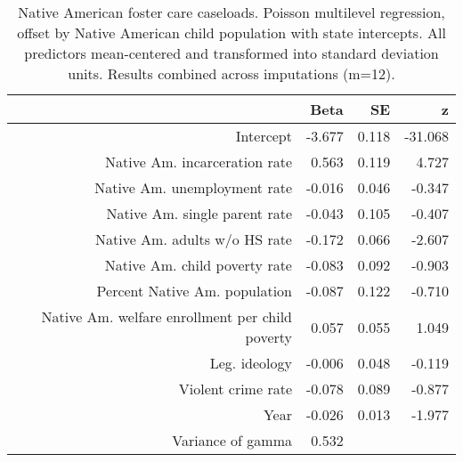 \begin{table}[ht]
\centering
\caption{Native American foster care caseloads. Poisson multilevel regression, 
             offset by Native American child population with state intercepts. 
             All predictors mean-centered and transformed into standard deviation units. 
             Results combined across imputations (m=12).} 
\label{a.c.tab}
\begin{tabular}{rrrr}
  \hline
 & Beta & SE & z \\ 
  \hline
Intercept & -3.677 & 0.118 & -31.068 \\ 
  Native Am. incarceration rate & 0.563 & 0.119 & 4.727 \\ 
  Native Am. unemployment rate & -0.016 & 0.046 & -0.347 \\ 
  Native Am. single parent rate & -0.043 & 0.105 & -0.407 \\ 
  Native Am. adults w/o HS rate & -0.172 & 0.066 & -2.607 \\ 
  Native Am. child poverty rate & -0.083 & 0.092 & -0.903 \\ 
  Percent Native Am. population & -0.087 & 0.122 & -0.710 \\ 
  Native Am. welfare enrollment per child poverty & 0.057 & 0.055 & 1.049 \\ 
  Leg. ideology & -0.006 & 0.048 & -0.119 \\ 
  Violent crime rate & -0.078 & 0.089 & -0.877 \\ 
  Year & -0.026 & 0.013 & -1.977 \\ 
  Variance of gamma & 0.532 &  &  \\ 
   \hline
\end{tabular}
\end{table}

